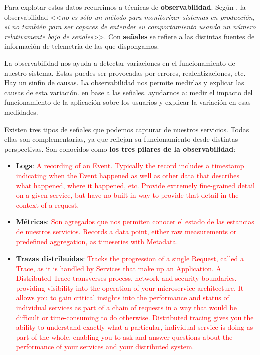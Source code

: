Para explotar estos datos recurrimos a técnicas de \textbf{observabilidad}. Según \cite{parkerProblemDistributedTracing2020}, la observabilidad <<\emph{no es sólo un método para monitorizar sistemas en producción, si no también para ser capaces de entender su comportamiento usando un número relativamente bajo de señales}>>. Con \textbf{señales} se refiere a las distintas fuentes de información de telemetría de las que dispongamos.

La observabilidad nos ayuda a detectar variaciones en el funcionamiento de nuestro sistema. Estas puedes ser provocadas por errores, realentizaciones, etc. Hay un sinfin de causas. La observabilidad nos permite medirlas y explicar las causas de esta variación. en base a las señales. ayudarnos a: medir el impacto del funcionamiento de la aplicación sobre los usuarios y explicar la variación en esas medidades.


Existen tres tipos de señales que podemos capturar de nuestros servicios. Todas ellas son complementarias, ya que reflejan su funcionamiento desde distintas perspectivas. Son conocidos como \textbf{los tres pilares de la observabilidad}:

\begin{itemize}
  \item \textbf{Logs}: \textcolor{red}{A recording of an Event. Typically the record includes a timestamp indicating when the Event happened as well as other data that describes what happened, where it happened, etc. \cite{opentelemetryOpenTelemetryDocumentation2022} Provide extremely fine-grained detail on a given service, but have no built-in way to provide that detail in the context of a request. \cite{parkerProblemDistributedTracing2020}}

  \item \textbf{Métricas}: \textcolor{red}{Son agregados que nos permiten conocer el estado de las estancias de nuestros servicios. Records a data point, either raw measurements or predefined aggregation, as timeseries with Metadata. \cite{opentelemetryOpenTelemetryDocumentation2022}}

  \item \textbf{Trazas distribuidas}: \textcolor{red}{Tracks the progression of a single Request, called a Trace, as it is handled by Services that make up an Application. A Distributed Trace transverses process, network and security boundaries. \cite{opentelemetryOpenTelemetryDocumentation2022}  providing visibility into the operation of your microservice architecture. It allows you to gain critical insights into the performance and status of individual services as part of a chain of requests in a way that would be difficult or time-consuming to do otherwise. Distributed tracing gives you the ability to understand exactly what a particular, individual service is doing as part of the whole, enabling you to ask and answer questions about the performance of your services and your distributed system. \cite{parkerProblemDistributedTracing2020}}
\end{itemize}

